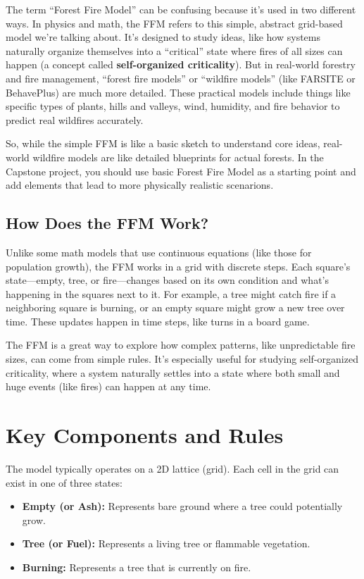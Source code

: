 \documentclass{article}
\begin{document}
The term ``Forest Fire Model'' can be confusing because it’s used in two different ways. In physics and math, the FFM refers to this simple, abstract grid-based model we’re talking about. It’s designed to study ideas, like how systems naturally organize themselves into a ``critical'' state where fires of all sizes can happen (a concept called \textbf{self-organized criticality}). But in real-world forestry and fire management, ``forest fire models'' or ``wildfire models'' (like FARSITE or BehavePlus) are much more detailed. These practical models include things like specific types of plants, hills and valleys, wind, humidity, and fire behavior to predict real wildfires accurately.

So, while the simple FFM is like a basic sketch to understand core ideas, real-world wildfire models are like detailed blueprints for actual forests. In the Capstone project, you should use basic Forest Fire Model as a starting point and add elements that lead to more physically realistic scenarions.

\subsection{How Does the FFM Work?}

Unlike some math models that use continuous equations (like those for population growth), the FFM works in a grid with discrete steps. Each square’s state---empty, tree, or fire---changes based on its own condition and what’s happening in the squares next to it. For example, a tree might catch fire if a neighboring square is burning, or an empty square might grow a new tree over time. These updates happen in time steps, like turns in a board game.

The FFM is a great way to explore how complex patterns, like unpredictable fire sizes, can come from simple rules. It’s especially useful for studying self-organized criticality, where a system naturally settles into a state where both small and huge events (like fires) can happen at any time.

\section{Key Components and Rules}

The model typically operates on a 2D lattice (grid). Each cell in the grid can exist in one of three states:
\begin{itemize}
    \item \textbf{Empty (or Ash):} Represents bare ground where a tree could potentially grow.
    \item \textbf{Tree (or Fuel):} Represents a living tree or flammable vegetation.
    \item \textbf{Burning:} Represents a tree that is currently on fire.
\end{itemize}
\end{document}
